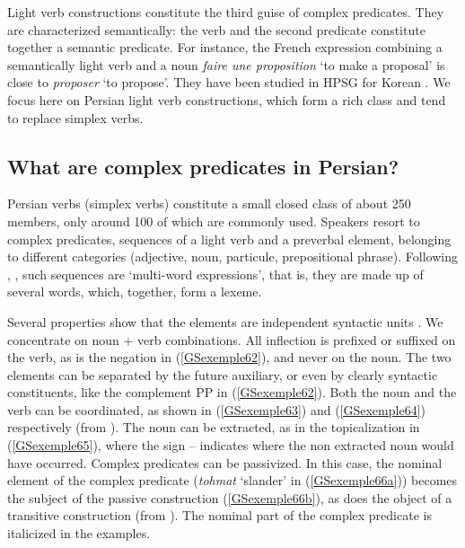 \documentclass[output=paper
	        ,collection
	        ,collectionchapter
 	        ,biblatex
                ,babelshorthands
                ,newtxmath
                ,draftmode
                ,colorlinks, citecolor=brown
]{langscibook}
\begin{document}
{Light verb constructions constitute the third guise of complex predicates. They are characterized semantically: the verb and the second predicate constitute together a semantic predicate. For instance, the French expression combining a semantically light verb and a noun \emph{faire une proposition} `to make a proposal’ is close to \emph{proposer} `to propose’. They have been studied in HPSG for Korean \citep{Ryu:93, lee2001argument, choi2001mixed, Kim2016a-u}. We focus here on Persian light verb constructions, which form a rich class and tend to replace simplex verbs.   
    
\subsection{What are complex predicates in Persian?}\label{GSsection5.1}

Persian verbs (simplex verbs) constitute a small closed class of about 250 members, only around 100 of which are commonly used. Speakers resort to complex predicates, sequences of a light verb and a preverbal element, belonging to different categories (adjective, noun, particule, prepositional phrase). Following \cite{bonami2010persian}, \cite{pollet2012grammaire}, such sequences are `multi-word expressions', that is, they are made up of several words, which, together, form a lexeme. 

Several properties show that the elements are independent syntactic units \citep{Karimi-Doostan97a, Megerdoomian2002a, pollet2012grammaire}. We concentrate on noun + verb combinations. All inflection is prefixed or suffixed on the verb, as is the negation in (\ref{GSexemple62}), and never on the noun. The two elements can be separated by the future auxiliary, or even by clearly syntactic constituents, like the complement PP in (\ref{GSexemple62}). Both the noun and the verb can be coordinated, as shown in (\ref{GSexemple63}) and (\ref{GSexemple64}) respectively (from \citealt[3]{bonami2010persian}). The noun can be extracted, as in the topicalization in (\ref{GSexemple65}), where the sign -- indicates where the non extracted noun would have occurred. Complex predicates can be passivized. In this case, the nominal element of the complex predicate (\emph{tohmat} `slander' in (\ref{GSexemple66a})) becomes the subject of the passive construction (\ref{GSexemple66b}), as does the object of a transitive construction (from \citealt[251]{pollet2012grammaire}). The nominal part of the complex predicate is italicized in the examples.

}
\end{document}
